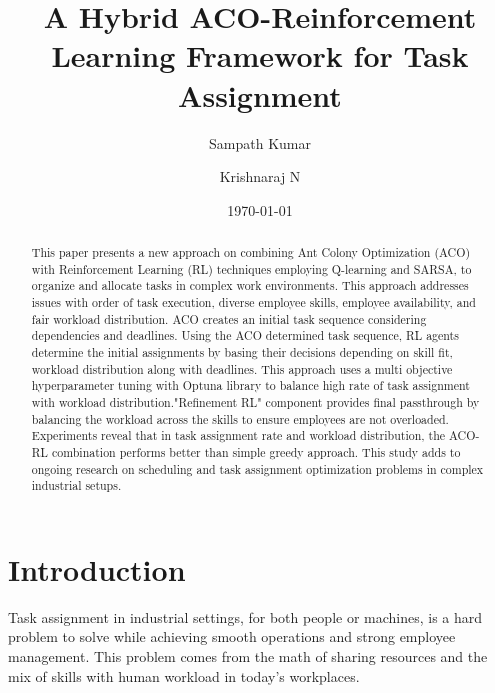 \documentclass[%
aip,
cp,  %
amsmath,amssymb,
reprint,%
]{revtex4-2}
\begin{document}
	
	\title{A Hybrid ACO-Reinforcement Learning Framework for Task Assignment}
	
	\author{Sampath Kumar}
	
	\author{Krishnaraj N}
	
	\date{\today}
	
	\begin{abstract}
		This paper presents a new approach on combining Ant Colony Optimization (ACO)
		with Reinforcement Learning (RL) techniques employing Q-learning and SARSA,
		to organize and allocate tasks in complex work environments. This approach addresses
		issues with order of task execution, diverse employee skills, employee availability,
		and fair workload distribution. ACO creates an initial task sequence considering
		dependencies and deadlines. Using the ACO determined task sequence, RL agents
		determine the initial assignments by basing their decisions depending on skill
		fit, workload distribution along with deadlines. This approach uses a multi objective
		hyperparameter tuning with Optuna library to balance high rate of task assignment
		with workload distribution."Refinement RL" component provides final passthrough
		by balancing the workload across the skills to ensure employees are not overloaded.
		Experiments reveal that in task assignment rate and workload distribution, the
		ACO-RL combination performs better than simple greedy approach. This study
		adds to ongoing research on scheduling and task assignment optimization
		problems in complex industrial setups.
	\end{abstract}
	
	
	\maketitle
	
	\section{\label{sec:intro}Introduction}
	Task assignment in industrial settings, for both people or machines, is a hard
	problem to solve while achieving smooth operations and strong employee management.
	This problem comes from the math of sharing resources and the mix of skills
	with human workload in today's workplaces.
	
\end{document}
